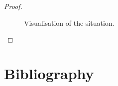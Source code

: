 \begin{proof}
\begin{figure}[h]
  \centering
  \def\svgwidth{0.7\textwidth}
  
  \caption{Visualisation of the situation.}
  \label{fi:n4_sigma}
\end{figure}
\end{proof}

\clearpage

\section{Bibliography}
\nocite{*}
\printbibliography[heading=none]


